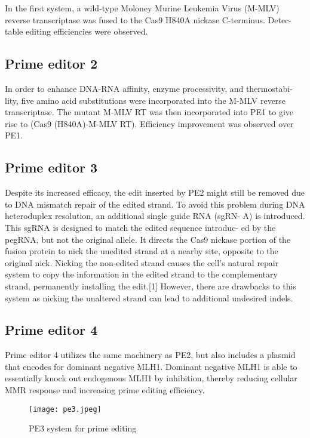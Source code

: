 \documentclass[a4paper,12pt]{extarticle}
\begin{document}
In the first system, a wild-type Moloney Murine Leukemia Virus (M-MLV) reverse transcriptase was fused to the Cas9 H840A nickase C-terminus. Detec- table editing efficiencies were observed.\\

\subsection{Prime editor 2}

In order to enhance DNA-RNA affinity, enzyme processivity, and thermostabi- lity, five amino acid substitutions were incorporated into the M-MLV reverse transcriptase. The mutant M-MLV RT was then incorporated into PE1 to give rise to (Cas9 (H840A)-M-MLV RT). Efficiency improvement was observed over PE1.\\

\subsection{Prime editor 3}

Despite its increased efficacy, the edit inserted by PE2 might still be removed due to DNA mismatch repair of the edited strand. To avoid this problem during DNA heteroduplex resolution, an additional single guide RNA (sgRN- A) is introduced. This sgRNA is designed to match the edited sequence introduc- ed by the pegRNA, but not the original allele. It directs the Cas9 nickase portion of the fusion protein to nick the unedited strand at a nearby site, opposite to the original nick. Nicking the non-edited strand causes the cell's natural repair system to copy the information in the edited strand to the complementary strand, permanently installing the edit.[1] However, there are drawbacks to this system as nicking the unaltered strand can lead to additional undesired indels.

\subsection{Prime editor 4}

Prime editor 4 utilizes the same machinery as PE2, but also includes a plasmid that encodes for dominant negative MLH1. Dominant negative MLH1 is able to essentially knock out endogenous MLH1 by inhibition, thereby reducing cellular MMR response and increasing prime editing efficiency.

\begin{figure}[h]
\texttt{[image: pe3.jpeg]}
\centering
\caption{PE3 system for prime editing}
\centering
\end{figure}
\end{document}
